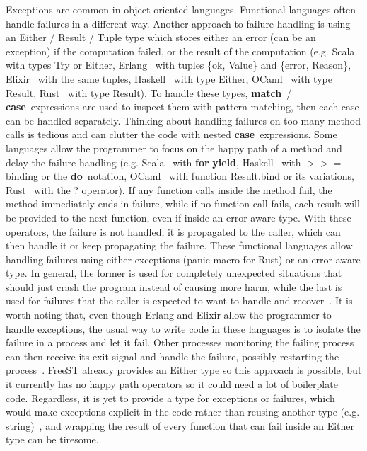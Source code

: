 \documentclass[sigplan]{acmart}
\newcommand{\syntax}[1]{\textbf{#1}}
\newcommand{\matchb}{\syntax{match}}
\newcommand{\caseb}{\syntax{case}}
\newcommand{\forb}{\syntax{for}}
\newcommand{\yieldb}{\syntax{yield}}
\newcommand{\dob}{\syntax{do}}
\begin{document}
Exceptions are common in object-oriented languages.
Functional languages often handle failures in a different way.
Another approach to failure handling is using an Either / Result / Tuple type which stores either an error (can be an exception) if the computation failed, or the result of the computation (e.g. Scala~\cite{scalabook,scalaeither} with types Try or Either, Erlang~\cite{erlangbookeh} with tuples \{ok, Value\} and \{error, Reason\}, Elixir~\cite{elixirbooktupleeh,elixireh} with the same tuples, Haskell~\cite{haskellbookfunctionaleh,haskellfunctionaleh} with type Either, OCaml~\cite{ocamlbook,ocamleh} with type Result, Rust~\cite{rustbook} with type Result).
To handle these types, \matchb~/ \caseb~expressions are used to inspect them with pattern matching, then each case can be handled separately.
Thinking about handling failures on too many method calls is tedious and can clutter the code with nested \caseb~expressions.
Some languages allow the programmer to focus on the happy path of a method and delay the failure handling (e.g. Scala~\cite{scalafunctionaleh} with \forb-\yieldb, Haskell~\cite{haskellbookhappyeh,haskellfunctionaleh} with $>>=$ binding or the \dob~notation, OCaml~\cite{ocamlbook,ocamleh} with function Result.bind or its variations, Rust~\cite{rustbook} with the ? operator).
If any function calls inside the method fail, the method immediately ends in failure, while if no function call fails, each result will be provided to the next function, even if inside an error-aware type.
With these operators, the failure is not handled, it is propagated to the caller, which can then handle it or keep propagating the failure.
These functional languages allow handling failures using either exceptions (panic macro for Rust) or an error-aware type.
In general, the former is used for completely unexpected situations that should just crash the program instead of causing more harm, while the last is used for failures that the caller is expected to want to handle and recover~\cite{elixirbooktupleeh,elixireh,ocamlbook,rustbook}.
It is worth noting that, even though Erlang and Elixir allow the programmer to handle exceptions, the usual way to write code in these languages is to isolate the failure in a process and let it fail.
Other processes monitoring the failing process can then receive its exit signal and handle the failure, possibly restarting the process~\cite{erlangbookprocesses,erlangprocesses,elixirbookprocesses,elixirprocesses}.
FreeST already provides an Either type so this approach is possible, but it currently has no happy path operators so it could need a lot of boilerplate code.
Regardless, it is yet to provide a type for exceptions or failures, which would make exceptions explicit in the code rather than reusing another type (e.g. string)~\cite{ocamleh}, and wrapping the result of every function that can fail inside an Either type can be tiresome.
\end{document}

